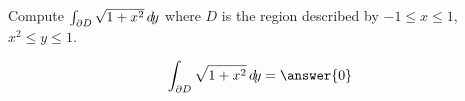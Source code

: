 \documentclass{ximera}
\author{David Guichard \and Neal Koblitz \and H. Jerome Keisler \and Albert Scheller \and Barry Balof \and Mike Wills \and Matthew Carr}
\begin{document}
\begin{exercise}




Compute $\int_{\partial D} \sqrt{1+x^2}\mathop{}\!d\! y$ where $D$ is the region described by $-1\le x\le 1$, $x^2\le y\le 1$. 
 

\begin{prompt}
\[
\int_{\partial D} \sqrt{1+x^2}\d y=\answer{0}
\]
\end{prompt}

\end{exercise}
\end{document}
